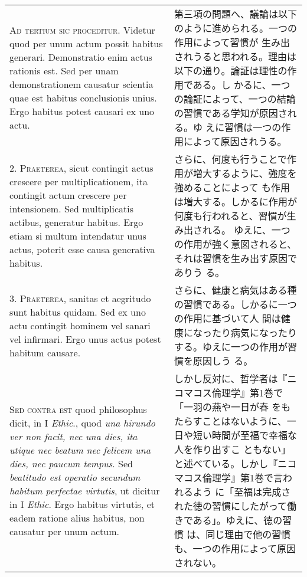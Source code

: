 \documentclass[10pt]{jsarticle} %
\begin{document}
\begin{longtable}{p{21em}p{21em}}


{\scshape Ad tertium sic proceditur}. Videtur quod per unum actum
possit habitus generari. Demonstratio enim actus rationis est. Sed per
unam demonstrationem causatur scientia quae est habitus conclusionis
unius. Ergo habitus potest causari ex uno actu.


&

第三項の問題へ、議論は以下のように進められる。一つの作用によって習慣が
生み出されうると思われる。理由は以下の通り。論証は理性の作用である。し
かるに、一つの論証によって、一つの結論の習慣である学知が原因される。ゆ
えに習慣は一つの作用によって原因されうる。

\\



2. {\scshape Praeterea}, sicut contingit actus crescere per
multiplicationem, ita contingit actum crescere per intensionem. Sed
multiplicatis actibus, generatur habitus. Ergo etiam si multum
intendatur unus actus, poterit esse causa generativa habitus.

&

さらに、何度も行うことで作用が増大するように、強度を強めることによって
も作用は増大する。しかるに作用が何度も行われると、習慣が生み出される。
ゆえに、一つの作用が強く意図されると、それは習慣を生み出す原因でありう
る。

\\


3. {\scshape Praeterea}, sanitas et aegritudo sunt habitus quidam. Sed
ex uno actu contingit hominem vel sanari vel infirmari. Ergo unus
actus potest habitum causare.

&

さらに、健康と病気はある種の習慣である。しかるに一つの作用に基づいて人
間は健康になったり病気になったりする。ゆえに一つの作用が習慣を原因しう
る。

\\



{\scshape Sed contra est} quod philosophus dicit, in I {\itshape
Ethic}., quod {\itshape una hirundo ver non facit, nec una dies, ita
utique nec beatum nec felicem una dies, nec paucum tempus}. Sed
{\itshape beatitudo est operatio secundum habitum perfectae virtutis},
ut dicitur in I {\itshape Ethic}. Ergo habitus virtutis, et eadem
ratione alius habitus, non causatur per unum actum.


&

しかし反対に、哲学者は『ニコマコス倫理学』第1巻で「一羽の燕や一日が春
をもたらすことはないように、一日や短い時間が至福で幸福な人を作り出すこ
ともない」と述べている。しかし『ニコマコス倫理学』第1巻で言われるよう
に「至福は完成された徳の習慣にしたがって働きである」。ゆえに、徳の習慣
は、同じ理由で他の習慣も、一つの作用によって原因されない。


\end{longtable}
\end{document}
